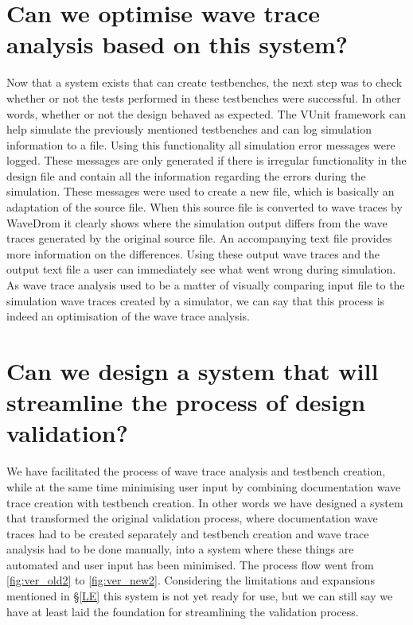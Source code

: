 \section{Can we optimise wave trace analysis based on this system?}
Now that a system exists that can create testbenches, the next step was to check whether or not the tests performed in these testbenches were successful. In other words, whether or not the design behaved as expected.
\npar
The VUnit framework can help simulate the previously mentioned testbenches and can log simulation information to a file. Using this functionality all simulation error messages were logged. These messages are only generated if there is irregular functionality in the design file and contain all the information regarding the errors during the simulation. These messages were used to create a new file, which is basically an adaptation of the source file. When this source file is converted to wave traces by WaveDrom it clearly shows where the simulation output differs from the wave traces generated by the original source file. An accompanying text file provides more information on the differences. Using these output wave traces and the output text file a user can immediately see what went wrong during simulation.
\npar
As wave trace analysis used to be a matter of visually comparing input file to the simulation wave traces created by a simulator, we can say that this process is indeed an optimisation of the wave trace analysis.
\section{Can we design a system that will streamline the process of design validation?}
We have facilitated the process of wave trace analysis and testbench creation, while at the same time minimising user input by combining documentation wave trace creation with testbench creation. In other words we have designed a system that transformed the original validation process, where documentation wave traces had to be created separately and testbench creation and wave trace analysis had to be done manually, into a system where these things are automated and user input has been minimised. The process flow went from \ref{fig:ver_old2} to \ref{fig:ver_new2}. \nline
{}\nline
Considering the limitations and expansions mentioned in §\ref{LE} this system is not yet ready for use, but we can still say we have at least laid the foundation for streamlining the validation process.\clearpage
